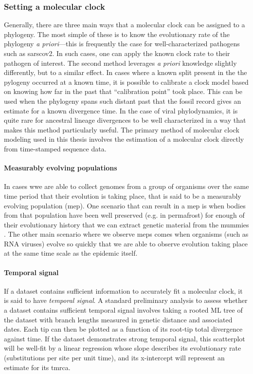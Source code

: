 \subsubsection{Setting a molecular clock}
Generally, there are three main ways that a molecular clock can be assigned to a phylogeny.
The most simple of these is to know the evolutionary rate of the phylogeny \textit{a priori}---this is frequently the case for well-characterized pathogens such as \gls{sarscov2}.
In such cases, one can apply the known clock rate to their pathogen of interest.
The second method leverages \textit{a priori} knowledge slightly differently, but to a similar effect.
In cases where a known split present in the the pylogeny occurred at a known time, it is possible to calibrate a clock model based on knowing how far in the past that ``calibration point'' took place.
This can be used when the phylogeny spans such distant past that the fossil record gives an estimate for a known divergence time.
In the case of viral phylodynamics, it is quite rare for ancestral lineage divergences to be well characterized in a way that makes this method particularly useful.
The primary method of molecular clock modeling used in this thesis involves the estimation of a molecular clock directly from time-stamped sequence data.

\paragraph*{Measurably evolving populations}
In cases wwe are able to collect genomes from a group of organisms over the same time period that their evolution is taking place, that is said to be a measurably evolving population (\gls{mep}).
One scenario that can result in a \gls{mep} is when bodies from that population have been well preserved (e.g. in permafrost) for enough of their evolutionary history that we can extract genetic material from the mummies \citep{shapiro2004rise}.
The other main scenario where we observe \gls{mep}s comes when organisms (such as RNA viruses) evolve so quickly that we are able to observe evolution taking place at the same time scale as the epidemic itself.

\paragraph*{Temporal signal}
If a dataset contains sufficient information to accurately fit a molecular clock, it is said to have \textit{temporal signal}.
A standard preliminary analysis to assess whether a dataset contains sufficient temporal signal involves taking a rooted ML tree of the dataset with branch lengths measured in genetic distance and associated dates.
Each tip can then be plotted as a function of its root-tip total divergence against time.
If the dataset demonstrates strong temporal signal, this scatterplot will be well-fit by a linear regression whose slope describes its evolutionary rate (substitutions per site per unit time), and its x-intercept will represent an estimate for its \gls{tmrca}.

